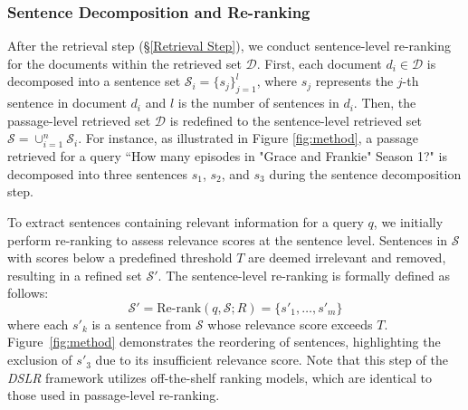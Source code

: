 
\subsubsection{Sentence Decomposition and Re-ranking}
After the retrieval step (§\ref{Retrieval Step}), we conduct sentence-level re-ranking for the documents within the retrieved set $\mathcal{D}$. First, each document $d_i \in \mathcal{D}$ is decomposed into a sentence set $\mathcal{S}_i = \{s_j\}_{j=1}^l$, where $s_j$ represents the $j$-th sentence in document $d_i$ and $l$ is the number of sentences in $d_i$. Then, the passage-level retrieved set $\mathcal{D}$ is redefined to the sentence-level retrieved set $\mathcal{S} = \cup_{i=1}^n \mathcal{S}_i$. For instance, as illustrated in Figure \ref{fig:method}, a passage retrieved for a query ``How many episodes in "Grace and Frankie" Season 1?" is decomposed into three sentences \( s_1 \), \( s_2 \), and \( s_3 \) during the sentence decomposition step.

To extract sentences containing relevant information for a query \( q \), we initially perform re-ranking to assess relevance scores at the sentence level. Sentences in \( \mathcal{S} \) with scores below a predefined threshold \( T \) are deemed irrelevant and removed, resulting in a refined set \( \mathcal{S'} \). The sentence-level re-ranking is formally defined as follows:
\[
\mathcal{S'}=\text{Re-rank}(q,\mathcal{S};R)=\{s'_1,\ldots,s'_m\}
\]
where each $s'_k$ is a sentence from $\mathcal{S}$ whose relevance score exceeds $T$. Figure~\ref{fig:method} demonstrates the reordering of sentences, highlighting the exclusion of $s'_3$ due to its insufficient relevance score.
Note that this step of the \textit{DSLR} framework utilizes off-the-shelf ranking models, which are identical to those used in passage-level re-ranking.

